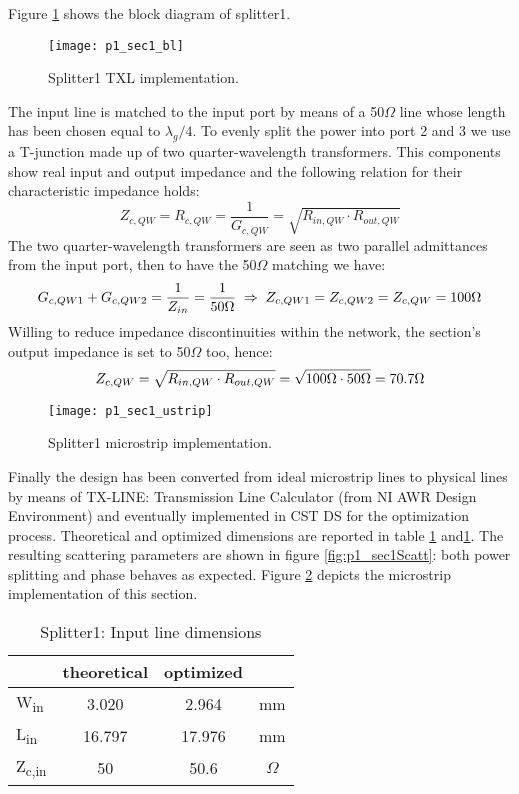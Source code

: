 Figure \ref{fig:p1_sec1_block} shows the block diagram of splitter1. 
\begin{figure}[H] 
	\centering
	\texttt{[image: p1\_sec1\_bl]}
	\caption{Splitter1 TXL implementation. }
	\label{fig:p1_sec1_block}
\end{figure}
The input line is matched to the input port by means of a 50$\Omega$ line whose length has been chosen equal to $\lambda_{g}/4$. To evenly split the power into port 2 and 3 we use a T-junction made up of two quarter-wavelength transformers. This components show real input and output impedance and the following relation for their characteristic impedance holds:
\begin{equation}
	\label{eq:p1_ZcQW}
	Z_{c,QW} =R_{c,QW}=\frac{1}{G_{c,QW}}= \sqrt{R_{in,QW}\cdot R_{out,QW}} 
\end{equation}
The two quarter-wavelength transformers are seen as two parallel admittances from the input port, then to have the 50$\Omega$ matching we have:
\begin{equation}
	G_{c,QW1}+G_{c,QW2}=\frac{1}{Z_{in}}=\frac{1}{50\Omega} \; \Rightarrow \; Z_{c,QW1}=Z_{c,QW2}=Z_{c,QW}=100\Omega \notag
\end{equation}
 Willing to reduce impedance discontinuities within the network, the section's output impedance is set to 50$\Omega$ too, hence:
\begin{equation}
	Z_{c,QW}= \sqrt{R_{in,QW}\cdot R_{out,QW}}=\sqrt{100\Omega\cdot 50\Omega}=70.7\Omega \notag
\end{equation}
\begin{figure}[H] 
	\centering
	\texttt{[image: p1\_sec1\_ustrip]}
	\caption{Splitter1 microstrip implementation. }
	\label{fig:p1_sec1_ustrip}
\end{figure}
Finally the design has been converted from ideal microstrip lines to physical lines by means of TX-LINE: Transmission Line Calculator (from NI AWR Design Environment) and eventually implemented in CST DS\texttrademark{} for the optimization process. 
Theoretical and optimized dimensions are reported in table \ref{tab:p1_sec1DimIN} and\ref{tab:p1_sec1DimIN}. The resulting scattering parameters are shown in figure \ref{fig:p1_sec1Scatt}: both power splitting and phase behaves as expected. Figure \ref{fig:p1_sec1_ustrip} depicts the microstrip implementation of this section.
\begin{table} [H]
	\label{tab:p1_sec1DimIN}
	\caption{Splitter1: Input line dimensions}
	\centering	
	\begin{tabular}{lccc} 
		\toprule
			& theoretical & optimized&\\
		\midrule 
		W\textsubscript{in} 	&	3.020		&	2.964	 & mm 		\\
		L\textsubscript{in}		&	16.797		& 	17.976		& mm	\\ 
		Z\textsubscript{c,in}	& 	50 & 50.6	&$\Omega$ \\
		\bottomrule
	\end{tabular}	
\end{table}

